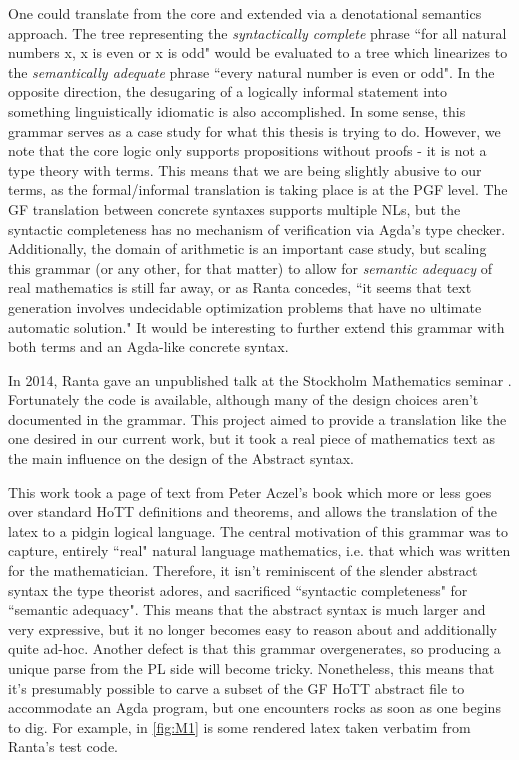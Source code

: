 One could translate from the core and extended via a denotational semantics
approach. The tree representing the \emph{syntactically complete} phrase ``for
all natural numbers x, x is even or x is odd" would be evaluated to a tree which
linearizes to the \emph{semantically adequate} phrase ``every natural number is
even or odd". In the opposite direction, the desugaring of a logically informal
statement into something linguistically idiomatic is also accomplished. In some
sense, this grammar serves as a case study for what this thesis is trying to do.
However, we note that the core logic only supports propositions without proofs -
it is not a type theory with terms. This means that we are being slightly
abusive to our terms, as the formal/informal translation is taking place is at
the PGF level. The GF translation between concrete syntaxes supports multiple
NLs, but the syntactic completeness has no mechanism of verification via Agda's
type checker. Additionally, the domain of arithmetic is an important case study,
but scaling this grammar (or any other, for that matter) to allow for
\emph{semantic adequacy} of real mathematics is still far away, or as Ranta
concedes, ``it seems that text generation involves undecidable optimization
problems that have no ultimate automatic solution." It would be interesting to
further extend this grammar with both terms and an Agda-like concrete syntax. 

In 2014, Ranta gave an unpublished talk at the Stockholm Mathematics seminar
\cite{aarneHott}. Fortunately the code is available, although many of the design
choices aren't documented in the grammar. This project aimed to provide a
translation like the one desired in our current work, but it took a real piece
of mathematics text as the main influence on the design of the Abstract syntax.

This work took a page of text from Peter Aczel's book which more or less goes
over standard HoTT definitions and theorems, and allows the translation of the
latex to a pidgin logical language. The central motivation of this grammar was
to capture, entirely ``real" natural language mathematics, i.e. that which was
written for the mathematician. Therefore, it isn't reminiscent of the slender
abstract syntax the type theorist adores, and sacrificed ``syntactic
completeness" for ``semantic adequacy". This means that the abstract syntax is
much larger and very expressive, but it no longer becomes easy to reason about
and additionally quite ad-hoc. Another defect is that this grammar
overgenerates, so producing a unique parse from the PL side will become tricky.
Nonetheless, this means that it's presumably possible to carve a subset of the
GF HoTT abstract file to accommodate an Agda program, but one encounters rocks as soon
as one begins to dig. For example, in \autoref{fig:M1} is some rendered latex
taken verbatim from Ranta's test code.


